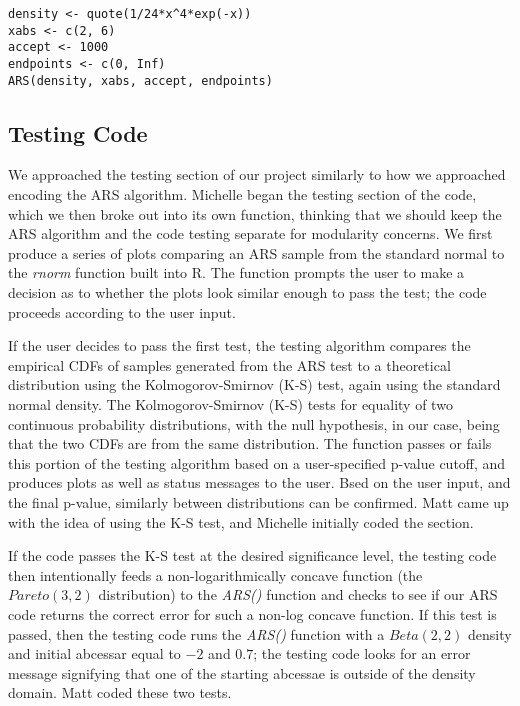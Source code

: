 \documentclass{article}
\begin{document}
\begin{lstlisting}
density <- quote(1/24*x^4*exp(-x))
xabs <- c(2, 6)
accept <- 1000
endpoints <- c(0, Inf)
ARS(density, xabs, accept, endpoints)
\end{lstlisting}


\subsection{Testing Code}
We approached the testing section of our project similarly to how we approached encoding the ARS algorithm.  Michelle began the testing section of the code, which we then broke out into its own function, thinking that we should keep the ARS algorithm and the code testing separate for modularity concerns.  We first produce a series of plots comparing an ARS sample from the standard normal to the \textit{rnorm} function built into R.  The function prompts the user to make a decision as to whether the plots look similar enough to pass the test; the code proceeds according to the user input.

If the user decides to pass the first test, the testing algorithm compares the empirical CDFs of samples generated from the ARS test to a theoretical distribution using the Kolmogorov-Smirnov (K-S) test, again using the standard normal density.  The Kolmogorov-Smirnov (K-S) tests for equality of two continuous probability distributions, with the null hypothesis, in our case, being that the two CDFs are from the same distribution. The function passes or fails this portion of the testing algorithm based on a user-specified p-value cutoff, and produces plots as well as status messages to the user.  Bsed on the user input, and the final p-value, similarly between distributions can be confirmed. Matt came up with the idea of using the K-S test, and Michelle initially coded the section.

If the code passes the K-S test at the desired significance level, the testing code then intentionally feeds a non-logarithmically concave function (the $Pareto\left(3,2\right)$ distribution) to the \textit{ARS()} function and checks to see if our ARS code returns the correct error for such a non-log concave function.  If this test is passed, then the testing code runs the \textit{ARS()} function with a $Beta\left(2,2\right)$ density and initial abcessar equal to $-2$ and $0.7$; the testing code looks for an error message signifying that one of the starting abcessae is outside of the density domain.  Matt coded these two tests.
\end{document}
